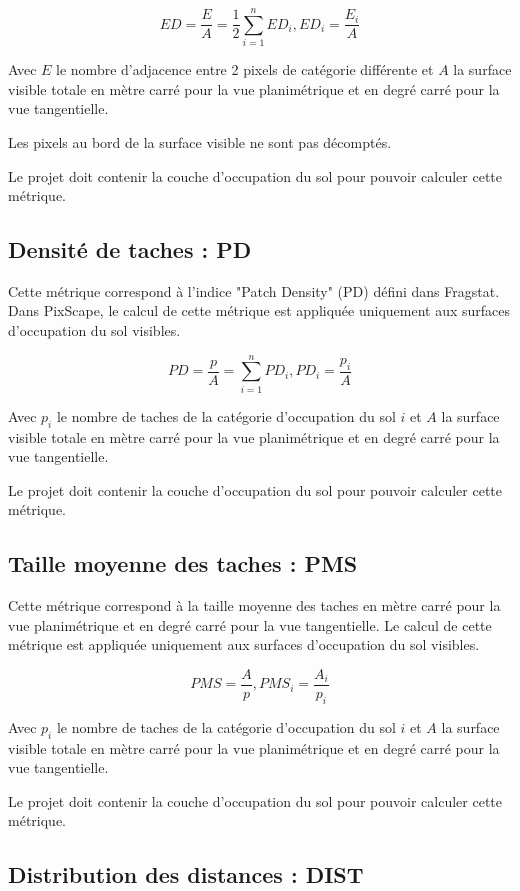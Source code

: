 \documentclass{report}
\begin{document}
$$ED = \frac{E}{A} = \frac{1}{2} \sum_{i=1}^{n} ED_i, ED_i = \frac{E_i}{A}$$

Avec $E$ le nombre d'adjacence entre 2 pixels de catégorie différente et $A$ la surface visible totale en mètre carré pour la vue planimétrique et en degré carré pour la vue tangentielle.

Les pixels au bord de la surface visible ne sont pas décomptés.

Le projet doit contenir la couche d'occupation du sol pour pouvoir calculer cette métrique.

\subsection{Densité de taches : PD}
Cette métrique correspond à l'indice "Patch Density" (PD) défini dans Fragstat. Dans PixScape, le calcul de cette métrique est appliquée uniquement aux surfaces d'occupation du sol visibles.

$$PD = \frac{p}{A} = \sum_{i=1}^{n} PD_i, PD_i = \frac{p_i}{A}$$

Avec $p_i$ le nombre de taches de la catégorie d'occupation du sol $i$ et $A$ la surface visible totale en mètre carré pour la vue planimétrique et en degré carré pour la vue tangentielle.

Le projet doit contenir la couche d'occupation du sol pour pouvoir calculer cette métrique.

\subsection{Taille moyenne des taches : PMS}
Cette métrique correspond à la taille moyenne des taches en mètre carré pour la vue planimétrique et en degré carré pour la vue tangentielle. Le calcul de cette métrique est appliquée uniquement aux surfaces d'occupation du sol visibles.

$$PMS = \frac{A}{p}, PMS_i = \frac{A_i}{p_i}$$

Avec $p_i$ le nombre de taches de la catégorie d'occupation du sol $i$ et $A$ la surface visible totale en mètre carré pour la vue planimétrique et en degré carré pour la vue tangentielle.

Le projet doit contenir la couche d'occupation du sol pour pouvoir calculer cette métrique.

\subsection{Distribution des distances : DIST}
\end{document}
